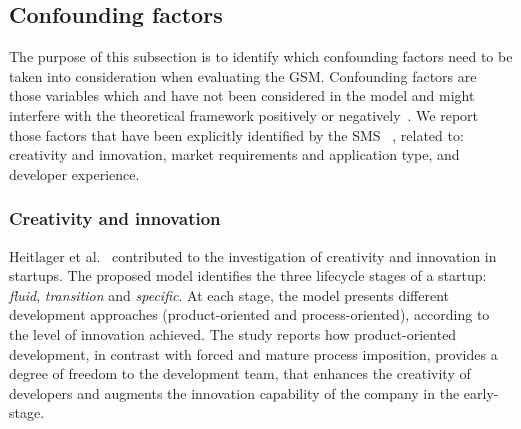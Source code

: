 \documentclass[10pt,journal,letterpaper,compsoc]{IEEEtran}
\begin{document}
\subsection{Confounding factors} \label{sect:an:comp:cat-vs-literature:conf}

The purpose of this subsection is to identify which confounding factors need to
be taken into consideration when evaluating the GSM. Confounding factors are
those variables which and have not been considered in the model and might
interfere with the theoretical framework positively or 
negatively~\cite{ColinRobson2009}. We report those factors that have been 
explicitly identified by the SMS~\cite{SMS} 
, related to: creativity and innovation, market requirements and application 
type, and developer experience.

\subsubsection{Creativity and innovation}
Heitlager et al.~\cite{Heitlager2007} contributed to the investigation of
creativity and innovation in startups. 
The proposed model identifies the three lifecycle stages of a
startup: \textit{fluid}, \textit{transition} and \textit{specific}. At each
stage, the model presents different development approaches (product-oriented
and process-oriented), according to the level of innovation achieved. The study
reports how product-oriented development, in contrast with forced and mature
process imposition, provides a degree of freedom to the development team, that
enhances the creativity of developers and augments the innovation capability of
the company in the early-stage.
\end{document}
